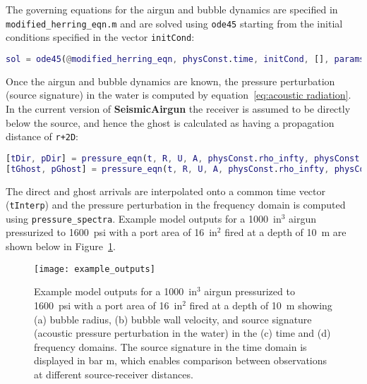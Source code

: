 \documentclass[10pt]{article}
\begin{document}
The governing equations for the airgun and bubble dynamics are specified in \texttt{modified\-\_herring\-\_eqn.m} and are solved using \texttt{ode45} starting from the initial conditions specified in the vector \texttt{initCond}:
\begin{lstlisting}[language=Matlab]
sol = ode45(@modified_herring_eqn, physConst.time, initCond, [], params);
\end{lstlisting}

Once the airgun and bubble dynamics are known, the pressure perturbation (source signature) in the water is computed by equation~\ref{eq:acoustic radiation}. In the current version of {\bf SeismicAirgun} the receiver is assumed to be directly below the source, and hence the ghost is calculated as having a propagation distance of \texttt{r+2D}:
\begin{lstlisting}[language=Matlab]
[tDir, pDir] = pressure_eqn(t, R, U, A, physConst.rho_infty, physConst.c_infty, physConst.r); %direct arrival
[tGhost, pGhost] = pressure_eqn(t, R, U, A, physConst.rho_infty, physConst.c_infty, physConst.r + 2*physConst.depth); %ghost arrival
\end{lstlisting}

The direct and ghost arrivals are interpolated onto a common time vector (\texttt{tInterp}) and the pressure perturbation in the frequency domain is computed using \texttt{pressure\_spectra}. Example model outputs for a 1000~in$^3$ airgun pressurized to 1600~psi with a port area of 16~in$^2$ fired at a depth of 10~m are shown below in Figure~\ref{fig:example outputs}.

\begin{figure}[h]
\centering
\texttt{[image: example\_outputs]}
\caption{Example model outputs for a 1000~in$^3$ airgun pressurized to 1600~psi with a port area of 16~in$^2$ fired at a depth of 10~m showing (a) bubble radius, (b) bubble wall velocity, and source signature (acoustic pressure perturbation in the water) in the (c) time and (d) frequency domains. The source signature in the time domain is displayed in bar m, which enables comparison between observations at different source-receiver distances.}
\label{fig:example outputs}
\end{figure}

\newpage


\end{document}
